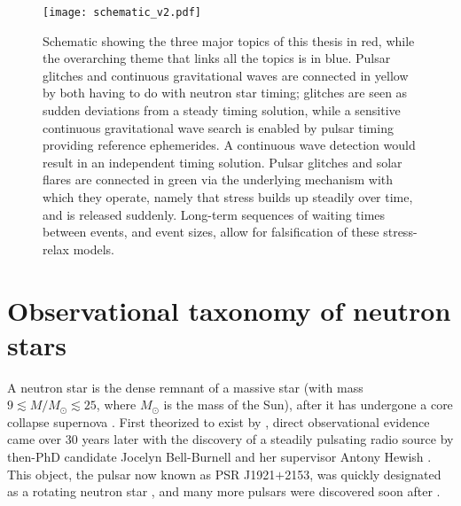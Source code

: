 \begin{figure}[t]
    \centering
    \texttt{[image: schematic\_v2.pdf]}
    \caption{Schematic showing the three major topics of this thesis in red, while the overarching theme that links all the topics is in blue. Pulsar glitches and continuous gravitational waves are connected in yellow by both having to do with neutron star timing; glitches are seen as sudden deviations from a steady timing solution, while a sensitive continuous gravitational wave search is enabled by pulsar timing providing reference ephemerides. A continuous wave detection would result in an independent timing solution. Pulsar glitches and solar flares are connected in green via the underlying mechanism with which they operate, namely that stress builds up steadily over time, and is released suddenly. Long-term sequences of waiting times between events, and event sizes, allow for falsification of these stress-relax models.}
    \label{fig:thesis_schema}
\end{figure}

\section{Observational taxonomy of neutron stars} \label{sec:intro_ns}
A neutron star is the dense remnant of a massive star (with mass $9 \lesssim M / M_\odot \lesssim 25$, where $M_\odot$ is the mass of the Sun), after it has undergone a core collapse supernova \citep{Shapiro1983}. First theorized to exist by \citet{Baade1934}, direct observational evidence came over 30 years later with the discovery of a steadily pulsating radio source by then-PhD candidate Jocelyn Bell-Burnell and her supervisor Antony Hewish \citep{Hewish1968}. This object, the pulsar now known as PSR J1921$+$2153, was quickly designated as a rotating neutron star \citep{Gold1968,Pacini1968}, and many more pulsars were discovered soon after \citep{Pilkington1968,Large1968,Turtle1968,Turtle1968a,Comella1969}.

